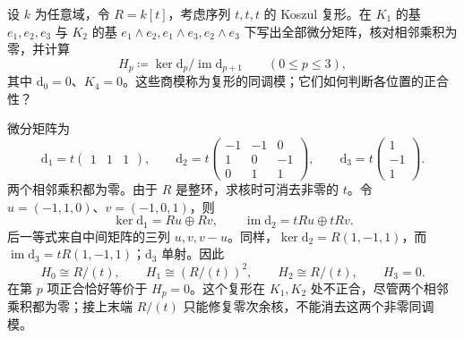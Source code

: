 \begin{exercise}\label{b2:ex:09-koszul-three}
	设 \(k\) 为任意域，令 \(R=k[t]\)，考虑序列 \(t,t,t\) 的 Koszul 复形。在 \(K_1\) 的基 \(e_1,e_2,e_3\) 与 \(K_2\) 的基 \(e_1\wedge e_2,e_1\wedge e_3,e_2\wedge e_3\) 下写出全部微分矩阵，核对相邻乘积为零，并计算
	\[
		H_p\coloneqq\ker\mathrm{d}_p/\operatorname{im}\mathrm{d}_{p+1}\qquad(0\le p\le3),
	\]
	其中 \(\mathrm{d}_0=0\)、\(K_4=0\)。这些商模称为复形的同调模；它们如何判断各位置的正合性？
\end{exercise}
\begin{solution}
	微分矩阵为
	\[
		\mathrm{d}_1=t\begin{pmatrix}1&1&1\end{pmatrix},\qquad
		\mathrm{d}_2=t\begin{pmatrix}-1&-1&0\\1&0&-1\\0&1&1\end{pmatrix},\qquad
		\mathrm{d}_3=t\begin{pmatrix}1\\-1\\1\end{pmatrix}.
	\]
	两个相邻乘积都为零。由于 \(R\) 是整环，求核时可消去非零的 \(t\)。令 \(u=(-1,1,0)\)、\(v=(-1,0,1)\)，则
	\[
		\ker\mathrm{d}_1=Ru\oplus Rv,\qquad \operatorname{im}\mathrm{d}_2=tRu\oplus tRv.
	\]
	后一等式来自中间矩阵的三列 \(u,v,v-u\)。同样，\(\ker\mathrm{d}_2=R(1,-1,1)\)，而 \(\operatorname{im}\mathrm{d}_3=tR(1,-1,1)\)；\(\mathrm{d}_3\) 单射。因此
	\[
		H_0\cong R/(t),\qquad H_1\cong(R/(t))^2,\qquad H_2\cong R/(t),\qquad H_3=0.
	\]
	在第 \(p\) 项正合恰好等价于 \(H_p=0\)。这个复形在 \(K_1,K_2\) 处不正合，尽管两个相邻乘积都为零；接上末端 \(R/(t)\) 只能修复零次余核，不能消去这两个非零同调模。
\end{solution}
